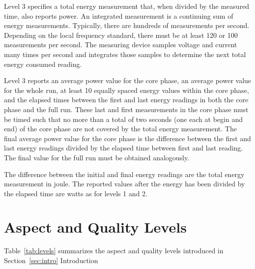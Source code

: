 \noindent
Level 3 specifies a total energy measurement that, when divided by the measured time, also reports power. An integrated measurement is a continuing sum of energy measurements. Typically, there are hundreds of measurements per second.  Depending on the local frequency standard, there must be at least 120 or 100 measurements per second. The measuring device samples voltage and current many times per second and integrates those samples to determine the next total energy consumed reading. 
\wl

\noindent
Level 3 reports an average power value for the core phase, an average power value for the whole run, at least 10 equally spaced energy values within the core phase, and the elapsed times between the first and last energy readings in both the core phase and the full run.
These last and first measurements in the core phase must be timed such that no more than a total of two seconds (one each at begin and end) of the core phase are not covered by the total energy measurement.
The final average power value for the core phase is the difference between the first and last energy readings divided by the elapsed time between first and last reading.
The final value for the full run must be obtained analogously.
\wl

\noindent
The difference between the initial and final energy readings are the total energy measurement in joule. The reported values after the energy has been divided by the elapsed time are watts as for levels 1 and 2.

\section{Aspect and Quality Levels}
\label{sec:AQLevels}
\noindent
Table~\ref{tab:levels} summarizes the aspect and quality levels introduced in Section~\ref{sec:intro} Introduction

